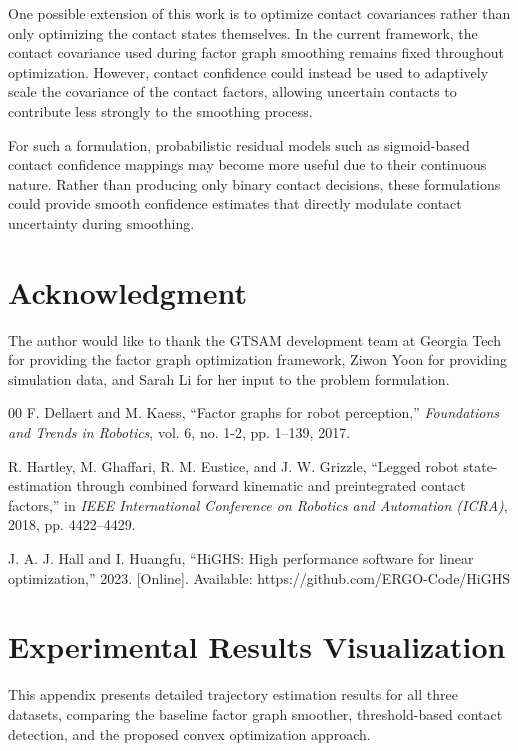 \documentclass[conference]{IEEEtran}
\begin{document}
One possible extension of this work is to optimize contact covariances rather than only optimizing the contact states themselves. In the current framework, the contact covariance used during factor graph smoothing remains fixed throughout optimization. However, contact confidence could instead be used to adaptively scale the covariance of the contact factors, allowing uncertain contacts to contribute less strongly to the smoothing process.

For such a formulation, probabilistic residual models such as sigmoid-based contact confidence mappings may become more useful due to their continuous nature. Rather than producing only binary contact decisions, these formulations could provide smooth confidence estimates that directly modulate contact uncertainty during smoothing.

\section*{Acknowledgment}
The author would like to thank the GTSAM development team at Georgia Tech for providing the factor graph optimization framework, Ziwon Yoon for providing simulation data, and Sarah Li for her input to the problem formulation.

\begin{thebibliography}{00}
 F. Dellaert and M. Kaess, ``Factor graphs for robot perception,'' \textit{Foundations and Trends in Robotics}, vol. 6, no. 1-2, pp. 1--139, 2017.

 R. Hartley, M. Ghaffari, R. M. Eustice, and J. W. Grizzle, ``Legged robot state-estimation through combined forward kinematic and preintegrated contact factors,'' in \textit{IEEE International Conference on Robotics and Automation (ICRA)}, 2018, pp. 4422--4429.

 J. A. J. Hall and I. Huangfu, ``HiGHS: High performance software for linear optimization,'' 2023. [Online]. Available: https://github.com/ERGO-Code/HiGHS

\end{thebibliography}

\appendix

\section{Experimental Results Visualization}

This appendix presents detailed trajectory estimation results for all three datasets, comparing the baseline factor graph smoother, threshold-based contact detection, and the proposed convex optimization approach.
\end{document}
